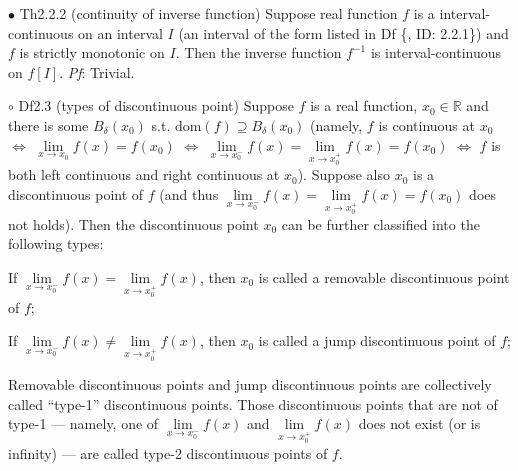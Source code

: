 \documentclass{article}
\begin{document}
\begin{Th}{$\bullet$ Th2.2.2 (continuity of inverse function)}
    Suppose real function $f$ is a interval-continuous on an interval $I$ (an interval of the form listed in Df \{, ID: 2.2.1\}) and $f$ is strictly monotonic on $I$. Then the inverse function $f^{-1}$ is interval-continuous on $f[I]$.
    \tcblower
    \textit{Pf}: Trivial.
\end{Th}

\begin{Df}{$\circ$ Df2.3 (types of discontinuous point)}
    Suppose $f$ is a real function, $x_0\in\mathbb{R}$ and there is some $B_\delta(x_0)$ s.t. $\text{dom}(f)\supseteq B_\delta(x_0)$ (namely, $f$ is continuous at $x_0$ $\Leftrightarrow$ $\lim\limits_{x\to x_0} f(x) = f(x_0)$ $\Leftrightarrow$ $\lim\limits_{x\to x_0^-} f(x) = \lim\limits_{x\to x_0^+} f(x) = f(x_0)$ $\Leftrightarrow$ $f$ is both left continuous and right continuous at $x_0$). Suppose also $x_0$ is a discontinuous point of $f$ (and thus $\lim\limits_{x\to x_0^-} f(x) = \lim\limits_{x\to x_0^+} f(x) = f(x_0)$ does not holds). Then the discontinuous point $x_0$ can be further classified into the following types:
    \begin{compactenum}
        \item If $\lim\limits_{x\to x_0^-} f(x) = \lim\limits_{x\to x_0^+} f(x)$, then $x_0$ is called a removable discontinuous point of $f$;
        \item If $\lim\limits_{x\to x_0^-} f(x) \neq \lim\limits_{x\to x_0^+} f(x)$, then $x_0$ is called a jump discontinuous point of $f$;
        \item Removable discontinuous points and jump discontinuous points are collectively called ``type-1'' discontinuous points. Those discontinuous points that are not of type-1 —  namely, one of $\lim\limits_{x\to x_0^-} f(x)$ and $\lim\limits_{x\to x_0^+} f(x)$ does not exist (or is infinity) —  are called type-2 discontinuous points of $f$.
    \end{compactenum} 
\end{Df}
\end{document}
